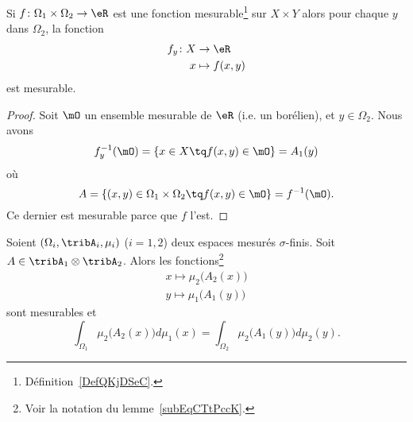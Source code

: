 \begin{corollary}
	Si \( f\colon \Omega_1\times \Omega_2\to \eR\) est une fonction mesurable\footnote{Définition~\ref{DefQKjDSeC}.} sur \( X\times Y\) alors pour chaque \( y\) dans \( \Omega_2\), la fonction
	\begin{equation}
		\begin{aligned}
			f_y\colon X & \to \eR        \\
			x           & \mapsto f(x,y)
		\end{aligned}
	\end{equation}
	est mesurable.
\end{corollary}

\begin{proof}
	Soit \( \mO\) un ensemble mesurable de \( \eR\) (i.e. un borélien), et \( y\in \Omega_2\). Nous avons
	\begin{equation}
		f_y^{-1}(\mO)=\{ x\in X\tq f(x,y)\in \mO \}=A_1(y)
	\end{equation}
	où
	\begin{equation}
		A=\{ (x,y)\in \Omega_1\times \Omega_2\tq f(x,y)\in \mO \}=f^{-1}(\mO).
	\end{equation}
	Ce dernier est mesurable parce que \( f\) l'est.
\end{proof}

\begin{theorem}    \label{ThoCCIsLhO}
	Soient \( (\Omega_i,\tribA_i,\mu_i)\) (\( i=1,2\)) deux espaces mesurés \( \sigma\)-finis. Soit \( A\in\tribA_1\otimes \tribA_2\). Alors les fonctions\footnote{Voir la notation du lemme~\ref{subEqCTtPccK}.}
	\begin{subequations}
		\begin{align}
			x\mapsto\mu_2\big( A_2(x) \big) \\
			y\mapsto\mu_1\big( A_1(y) \big)
		\end{align}
	\end{subequations}
	sont mesurables et
	\begin{equation}    \label{EqRKXwsQJ}
		\int_{\Omega_1}\mu_2\big( A_2(x) \big)d\mu_1(x)=\int_{\Omega_2}\mu_2\big( A_1(y) \big)d\mu_2(y).
	\end{equation}
\end{theorem}

